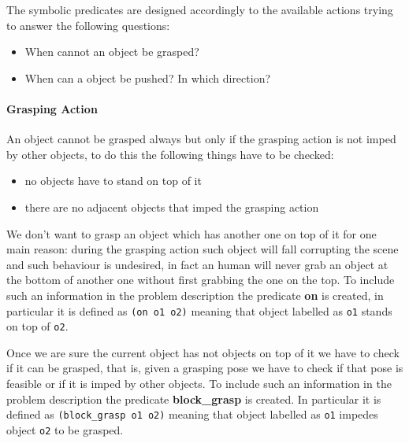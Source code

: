 The symbolic predicates are designed accordingly to the available actions trying to answer the following questions:
\begin{itemize}
\item When cannot an object be grasped? 
\item When can a object be pushed? In which direction? 
\end{itemize}

\paragraph{Grasping Action}
An object cannot be grasped always but only if the grasping action is not imped by other objects, to do this the following things have to be checked:
\begin{itemize}
\item no objects have to stand on top of it
\item there are no adjacent objects that imped the grasping action
\end{itemize}
We don't want to grasp an object which has another one on top of it for one main reason: during the grasping action such object will fall corrupting the scene and such behaviour is undesired, in fact an human will never grab an object at the bottom of another one without first grabbing the one on the top. To include such an information in the problem description the predicate \textbf{on} is created, in particular it is defined as \texttt{(on o1 o2)} meaning that object labelled as \texttt{o1} stands on top of \texttt{o2}.

Once we are sure the current object has not objects on top of it we have to check if it can be grasped, that is, given a grasping pose we have to check if that pose is feasible or if it is imped by other objects. To include such an information in the problem description the predicate \textbf{block\_grasp} is created. In particular it is defined as \texttt{(block\_grasp o1 o2)} meaning that object labelled as \texttt{o1} impedes object \texttt{o2} to be grasped.

